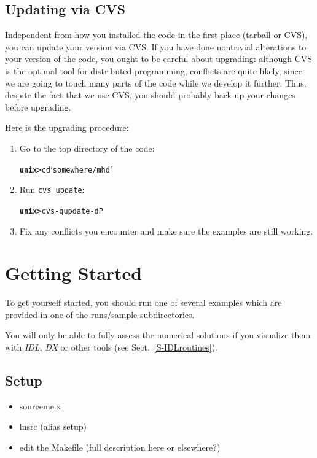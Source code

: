 \documentclass[12pt,twoside,notitlepage,a4paper]{article}
\newcommand{\prompt}[1]{{\ttfamily\bfseries{}#1}}
\newcommand{\code}[1]{\texttt{#1}}
\newcommand{\file}[1]{`\texttt{#1}'}
\newcommand{\command}[1]{\code{#1}\index{#1}}
\newcommand{\cmd}[1]{\command{#1}}
\newcommand{\name}[1]{\textsl{#1}\index{#1}\/}
\begin{document}
\subsection{Updating via CVS}

Independent from how you installed the code in the first place (tarball or
CVS), you can update your version via CVS.
If you have done nontrivial alterations to your version of the code, you
ought to be careful about upgrading: although CVS is the optimal tool for
distributed programming, conflicts are quite likely, since we are going to
touch many parts of the code while we develop it further.
Thus, despite the fact that we use CVS, you should probably back up your
changes before upgrading.

Here is the upgrading procedure:
\begin{enumerate}
\item Go to the top directory of the code:
  \begin{alltt}
  \prompt{unix> } cd \file{somewhere/mhd} \
  \end{alltt}
\item Run \cmd{cvs update}:
  \begin{alltt}
  \prompt{unix> } cvs -q update -dP \
  \end{alltt}
\item Fix any conflicts you encounter and make sure the examples are still
  working.
\end{enumerate}



\section{Getting Started}

To get yourself started, you should run one of several examples which are
provided in one of the runs/sample subdirectories.

You will only be able to fully assess the numerical solutions if you
visualize them with \name{IDL}, \name{DX} or other tools (see
Sect.~\ref{S-IDLroutines}).


\subsection{Setup}

\begin{itemize}
\item sourceme.x
\item lnsrc (alias setup)
\item edit the Makefile (full description here or elsewhere?)
\end{itemize}
\vspace{7cm}
\end{document}
